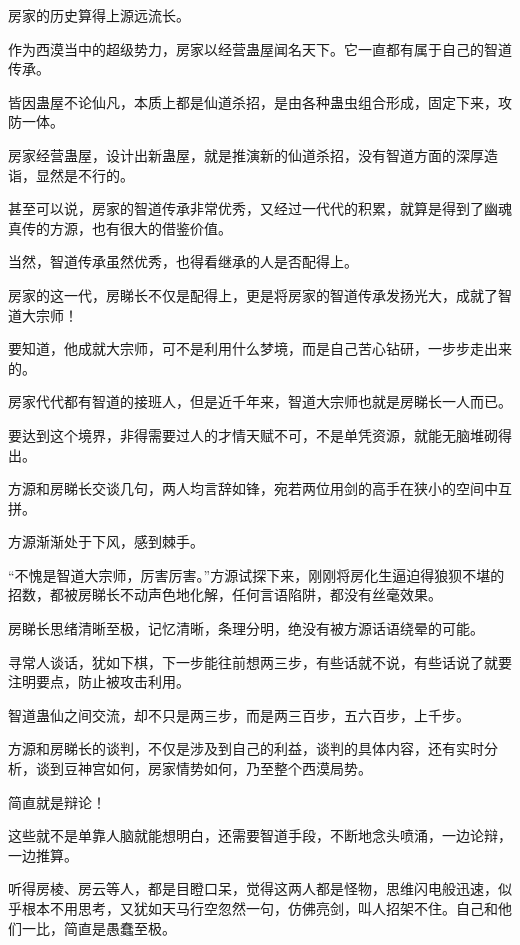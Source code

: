 
\begin{this_body}

房家的历史算得上源远流长。

作为西漠当中的超级势力，房家以经营蛊屋闻名天下。它一直都有属于自己的智道传承。

皆因蛊屋不论仙凡，本质上都是仙道杀招，是由各种蛊虫组合形成，固定下来，攻防一体。

房家经营蛊屋，设计出新蛊屋，就是推演新的仙道杀招，没有智道方面的深厚造诣，显然是不行的。

甚至可以说，房家的智道传承非常优秀，又经过一代代的积累，就算是得到了幽魂真传的方源，也有很大的借鉴价值。

当然，智道传承虽然优秀，也得看继承的人是否配得上。

房家的这一代，房睇长不仅是配得上，更是将房家的智道传承发扬光大，成就了智道大宗师！

要知道，他成就大宗师，可不是利用什么梦境，而是自己苦心钻研，一步步走出来的。

房家代代都有智道的接班人，但是近千年来，智道大宗师也就是房睇长一人而已。

要达到这个境界，非得需要过人的才情天赋不可，不是单凭资源，就能无脑堆砌得出。

方源和房睇长交谈几句，两人均言辞如锋，宛若两位用剑的高手在狭小的空间中互拼。

方源渐渐处于下风，感到棘手。

“不愧是智道大宗师，厉害厉害。”方源试探下来，刚刚将房化生逼迫得狼狈不堪的招数，都被房睇长不动声色地化解，任何言语陷阱，都没有丝毫效果。

房睇长思绪清晰至极，记忆清晰，条理分明，绝没有被方源话语绕晕的可能。

寻常人谈话，犹如下棋，下一步能往前想两三步，有些话就不说，有些话说了就要注明要点，防止被攻击利用。

智道蛊仙之间交流，却不只是两三步，而是两三百步，五六百步，上千步。

方源和房睇长的谈判，不仅是涉及到自己的利益，谈判的具体内容，还有实时分析，谈到豆神宫如何，房家情势如何，乃至整个西漠局势。

简直就是辩论！

这些就不是单靠人脑就能想明白，还需要智道手段，不断地念头喷涌，一边论辩，一边推算。

听得房棱、房云等人，都是目瞪口呆，觉得这两人都是怪物，思维闪电般迅速，似乎根本不用思考，又犹如天马行空忽然一句，仿佛亮剑，叫人招架不住。自己和他们一比，简直是愚蠢至极。


\end{this_body}
